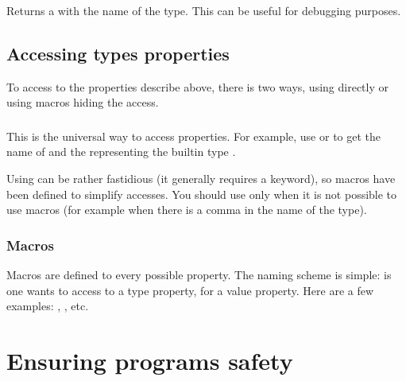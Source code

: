 \subsubsection{}

Returns a  with the name of the type. This can be useful
for debugging purposes.

\subsection{Accessing types properties}

To access to the properties describe above, there is two ways, using
directly  or using macros hiding the access.

\subsubsection{}

This is the universal way to access properties. For example, use
 or
 to get the name of
 and the  representing the builtin
type .

Using  can be rather fastidious (it generally
requires a  keyword), so macros have been defined to
simplify accesses. You should use  only when it is
not possible to use macros (for example when there is a comma in the
name of the type).

\subsubsection{Macros}

Macros are defined to every possible property. The naming scheme is
simple:  is one wants to access to a
type property,  for a value property. Here are
a few examples: ,
, etc.

\section{Ensuring programs safety}

\subsection{}

